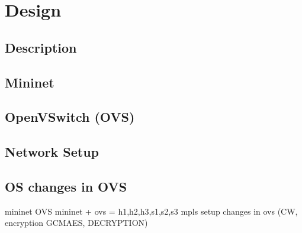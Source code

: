 \chapter{Design}
\section{Description}
\section{Mininet}
\section{OpenVSwitch (OVS)}
\section{Network Setup}
\section{OS changes in OVS}

mininet
OVS
mininet + ovs = h1,h2,h3,s1,s2,s3
mpls setup
changes in ovs (CW, encryption GCMAES, DECRYPTION)
